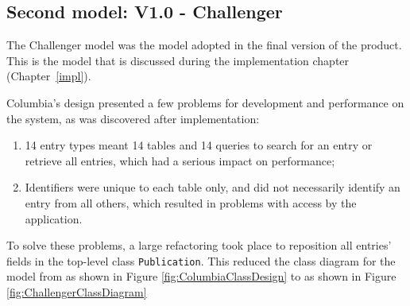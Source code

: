 \subsection{Second model: V1.0 - Challenger}
\label{designChallenger}
The Challenger model was the model adopted in the final version of the product.  This is the model that is discussed during the implementation chapter (Chapter~\ref{impl}).

Columbia's design presented a few problems for development and performance on the system, as was discovered after implementation:
\begin{enumerate}
	\item 14 entry types meant 14 tables and 14 queries to search for an entry or retrieve all entries, which had a serious impact on performance;
	\item Identifiers were unique to each table only, and did not necessarily identify an entry from all others, which resulted in problems with access by the application.
\end{enumerate}

To solve these problems, a large refactoring took place to reposition all entries' fields in the top-level class \texttt{Publication}.  This reduced the class diagram for the model from as shown in Figure \ref{fig:ColumbiaClassDesign} to as shown in Figure \ref{fig:ChallengerClassDiagram}

